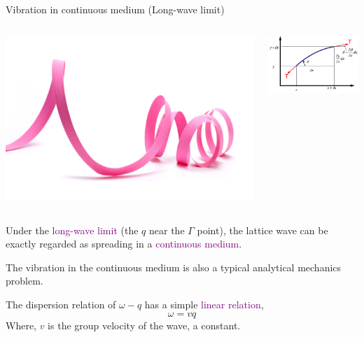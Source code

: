 \documentclass{beamer}
\begin{document}

\begin{frame}{Vibration in continuous medium (Long-wave limit)}
  \begin{columns}
    \begin{column}{0.4\textwidth}
      \includegraphics[width=\textwidth]{figure/ribbon.jpg}
    \end{column}
    \begin{column}{0.4\textwidth}
      \includegraphics[width=\textwidth]{figure/longwave.png}
    \end{column}
  \end{columns}
  Under the \textcolor{purple}{long-wave limit} (the \(q\) near the \(\Gamma\) point), the lattice wave can be exactly regarded as spreading in a \textcolor{purple}{continuous medium}.

  The vibration in the continuous medium is also a typical analytical mechanics problem.
  \begin{block}{}
    The dispersion relation of \(\omega - q\) has a simple \textcolor{purple}{linear relation}, 
    \begin{equation}
      \omega = vq
    \end{equation}
    Where, \textcolor{purple}{\(v\)} is the group velocity of the wave, a constant.
  \end{block}
  
\end{frame}
\end{document}
